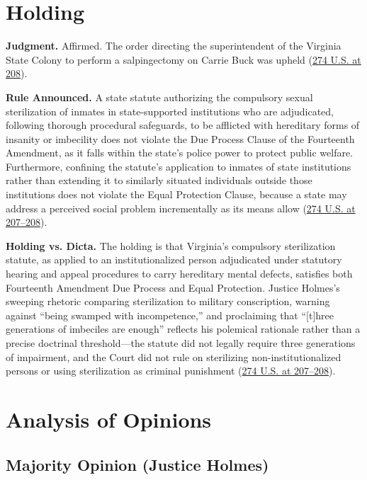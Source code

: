 \documentclass[12pt]{article}
\begin{document}
\section{Holding}

\textbf{Judgment.} Affirmed. The order directing the superintendent of the Virginia State Colony to perform a salpingectomy on Carrie Buck was upheld (\href{https://supreme.justia.com/cases/federal/us/274/200/}{274 U.S. at 208}).

\textbf{Rule Announced.} A state statute authorizing the compulsory sexual sterilization of inmates in state-supported institutions who are adjudicated, following thorough procedural safeguards, to be afflicted with hereditary forms of insanity or imbecility does not violate the Due Process Clause of the Fourteenth Amendment, as it falls within the state's police power to protect public welfare. Furthermore, confining the statute's application to inmates of state institutions rather than extending it to similarly situated individuals outside those institutions does not violate the Equal Protection Clause, because a state may address a perceived social problem incrementally as its means allow (\href{https://supreme.justia.com/cases/federal/us/274/200/}{274 U.S. at 207--208}).

\textbf{Holding vs. Dicta.} The holding is that Virginia's compulsory sterilization statute, as applied to an institutionalized person adjudicated under statutory hearing and appeal procedures to carry hereditary mental defects, satisfies both Fourteenth Amendment Due Process and Equal Protection. Justice Holmes's sweeping rhetoric comparing sterilization to military conscription, warning against ``being swamped with incompetence,'' and proclaiming that ``[t]hree generations of imbeciles are enough'' reflects his polemical rationale rather than a precise doctrinal threshold---the statute did not legally require three generations of impairment, and the Court did not rule on sterilizing non-institutionalized persons or using sterilization as criminal punishment (\href{https://supreme.justia.com/cases/federal/us/274/200/}{274 U.S. at 207--208}).

\section{Analysis of Opinions}

\subsection{Majority Opinion (Justice Holmes)}
\end{document}
